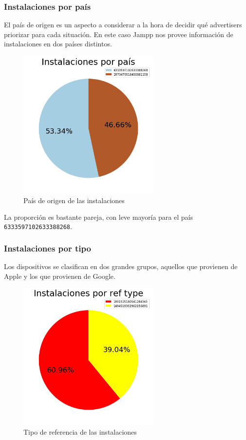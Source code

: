 \documentclass[a4paper, 12pt]{article}
\begin{document}
	\subsubsection{Instalaciones por país}
		El país de origen es un aspecto a considerar a la hora de decidir qué advertisers priorizar para cada situación. En este caso Jampp nos provee información de instalaciones en dos países distintos.

		\FloatBarrier
		\begin{figure}[h]
			\centering
			\includegraphics[width=200pt]{images/installs/piechartpaises.png}
			\caption{País de origen de las instalaciones}
		\end{figure}
		\FloatBarrier

		La proporción es bastante pareja, con leve mayoría para el país \texttt{6333597102633388268}.

	\subsubsection{Instalaciones por tipo}
		Los dispositivos se clasifican en dos grandes grupos, aquellos que provienen de Apple y los que provienen de Google.

		\FloatBarrier
		\begin{figure}[h]
			\centering
			\includegraphics[width= 200pt]{images/installs/ref_type.png}
			\caption{Tipo de referencia de las instalaciones}
		\end{figure}
		\FloatBarrier
\end{document}
